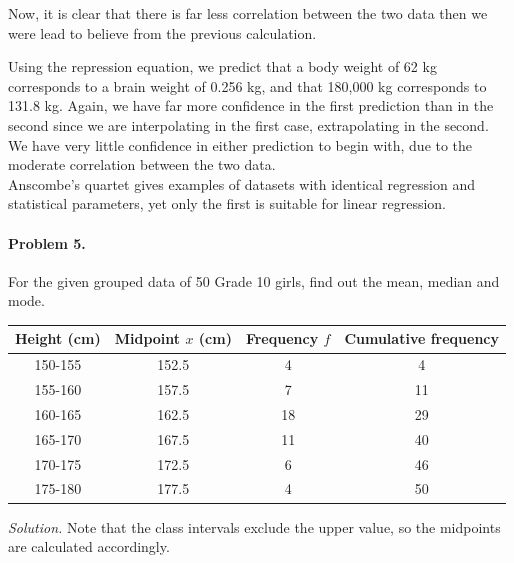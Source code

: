 \documentclass[10pt]{article}
\begin{document}
        Now, it is clear that there is far less correlation between the two data then we were lead to believe from the previous calculation.

        Using the repression equation, we predict that a body weight of 62 kg corresponds to a brain weight of 0.256 kg, and that
        180,000 kg corresponds to 131.8 kg.
        Again, we have far more confidence in the first prediction than in the second since we are interpolating in the first case, extrapolating 
        in the second.
        We have very little confidence in either prediction to begin with, due to the moderate correlation between the two data. \\

        Anscombe's quartet gives examples of datasets with identical regression and statistical parameters, yet only the first is suitable for
        linear regression.

        \paragraph{Problem 5.} For the given grouped data of 50 Grade 10 girls, find out the mean, median and mode.
        \begin{table}[H]
                \centering
                \label{tab:grouped}
                \begin{tabular}{cccc}\hline
                Height (cm)     & Midpoint $x$ (cm)     & Frequency $f$ & Cumulative frequency  \\\hline
                150-155         & 152.5                 & 4             & 4 \\
                155-160         & 157.5                 & 7             & 11 \\
                160-165         & 162.5                 & 18            & 29 \\
                165-170         & 167.5                 & 11            & 40 \\
                170-175         & 172.5                 & 6             & 46 \\
                175-180         & 177.5                 & 4             & 50 \\\hline
                \end{tabular}
        \end{table}

        \textit{Solution.} Note that the class intervals exclude the upper value, so the midpoints are calculated accordingly.
\end{document}
